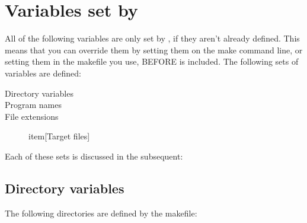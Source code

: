 \documentclass{report}
\begin{document}
\section{Variables set by }

All of the following variables are only set by , if
they aren't already defined. This means that you can override them by
setting them on the make command line, or setting them in the makefile you
use, BEFORE  is included.
The following sets of variables are defined:
\begin{description}
\item[Directory variables]
\item[Program names]
\item[File extensions]
item[Target files]
\end{description}
Each of these sets is discussed in the subsequent:
\subsection{Directory variables}

The following directories are defined by the makefile:
\end{document}
